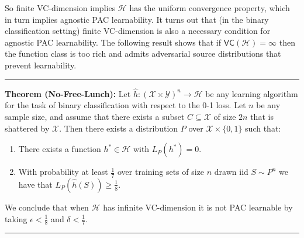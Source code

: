 \documentclass[]{article}
\begin{document}
So finite VC-dimension implies \(\mathcal{H}\) has the uniform
convergence property, which in turn implies agnostic PAC learnability.
It turns out that (in the binary classification setting) finite
VC-dimension is also a necessary condition for agnostic PAC
learnability. The following result shows that if
\(\mathsf{VC}(\mathcal{H}) = \infty\) then the function class is too
rich and admits adversarial source distributions that prevent
learnability.

\begin{center}\rule{0.5\linewidth}{\linethickness}\end{center}

\textbf{Theorem (No-Free-Lunch):} Let
\(\hat{h}:(\mathcal{X}\times\mathcal{Y})^n \rightarrow \mathcal{H}\) be
any learning algorithm for the task of binary classification with
respect to the 0-1 loss. Let \(n\) be any sample size, and assume that
there exists a subset \(C\subseteq \mathcal{X}\) of size \(2n\) that is
shattered by \(\mathcal{X}\). Then there exists a distribution \(P\)
over \(\mathcal{X}\times\{0,1\}\) such that:

\begin{enumerate}
\def\labelenumi{\arabic{enumi}.}
\item
  There exists a function \(h^*\in \mathcal{H}\) with \(L_P(h^*) = 0\).
\item
  With probability at least \(\frac{1}{7}\) over training sets of size
  \(n\) drawn iid \(S\sim P^n\) we have that
  \(L_P(\hat{h}(S)) \ge \frac{1}{8}\).
\end{enumerate}

We conclude that when \(\mathcal{H}\) has infinite VC-dimension it is
not PAC learnable by taking \(\epsilon < \frac{1}{8}\) and
\(\delta < \frac{1}{7}\).

\begin{center}\rule{0.5\linewidth}{\linethickness}\end{center}
\end{document}
